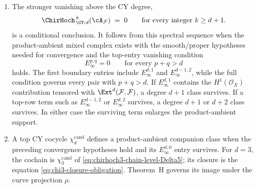 \begin{theorem}
\begin{enumerate}[label=\textup{(\roman*)}]
\item The stronger vanishing above the CY degree,
\begin{equation}
\label{eq:chirhoch-vanish-above-d}
 \ChirHoch^{\,k}_{\,\CY\text{-}d}(\cA_\mathcal F)
 \;=\;0
 \qquad\text{for every integer } k\ge d+1.
\end{equation}
is a conditional conclusion.  It follows from this spectral sequence
when the product-ambient mixed complex
exists with the smooth/proper hypotheses needed for convergence and the
top-entry vanishing condition
\[
 E_\infty^{p,q}=0\qquad\text{for every }p+q>d
\]
holds.  The first boundary entries include
$E_\infty^{d,1}$ and $E_\infty^{d-1,2}$, while the full condition
governs every pair with $p+q>d$.
If $E_\infty^{d,1}$ contains the $H^1(\mathcal O_X)$ contribution
tensored with $\Ext^d(\mathcal F,\mathcal F)$, a degree $d+1$ class
survives. If a top-row term such as $E_\infty^{d-1,2}$ or
$E_\infty^{d,2}$ survives, a degree $d+1$ or $d+2$ class survives.
In either case the surviving term enlarges the product-ambient
support.

\item A top CY cocycle \(\chi_d^{\mathrm{cand}}\) defines a
product-ambient companion class when the preceding convergence
hypotheses hold and its \(E_\infty^{d,0}\) entry survives.  For \(d=3\),
the cochain is \(\chi_3^{\mathrm{cand}}\) of
\eqref{eq:chirhoch3-chain-level-Delta5}; its closure is the equation
\eqref{eq:chi3-closure-obligation}.  Theorem~H governs its image under
the curve projection \(\rho\).
\end{enumerate}
\end{theorem}

